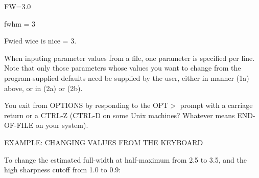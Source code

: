 \indent\indent\indent FW=3.0

\indent\indent\indent fwhm = 3

\indent\indent\indent Fwied wice is nice = 3.

\noindent When inputing parameter values from a file, one parameter is
specified per line.  Note that only those parameters whose values you
want to change from the program-supplied defaults need be supplied by
the user, either in manner (1a) above, or in (2a) or (2b).

You exit from OPTIONS by responding to the OPT$>$ prompt with a
carriage return or a CTRL-Z (CTRL-D on some Unix machines?  Whatever
means END-OF-FILE on your system).

\vfill
\eject
\noindent EXAMPLE: CHANGING VALUES FROM THE KEYBOARD

To change the estimated full-width at half-maximum from 2.5 to 3.5,
and the high sharpness cutoff from 1.0 to 0.9:


